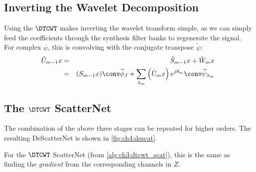 \subsection{Inverting the Wavelet Decomposition}
Using the $\DTCWT$ makes inverting the wavelet transform simple, as we
can simply feed the coefficients through the synthesis filter banks to regenerate
the signal. For complex $\psi$, this is convolving with the conjugate transpose
$\widetilde{\psi}$:
\begin{eqnarray}
  \label{eq:ch4:x_hat}
  \hat{U}_{m-1}x &=& \hat{S}_{m-1}x + \hat{W}_{m}x \\
                 &=& (S_{m-1}x) \conv \widetilde{\phi}_J + \sum_{\lambda_m} \left(\hat{U}_m x\right) e^{j\theta_m}
  \conv \widetilde{\psi}_{\lambda_m}
\end{eqnarray}

\subsection{The $\DTCWT$ ScatterNet}
The combination of the above three stages can be repeated for higher orders. The
resulting DeScatterNet is shown in \autoref{fig:ch4:descat}.

For the $\DTCWT$ ScatterNet (from \autoref{alg:ch3:dtcwt_scat}), this is the same
as finding the \emph{gradient} from the corresponding channels in $Z$.

